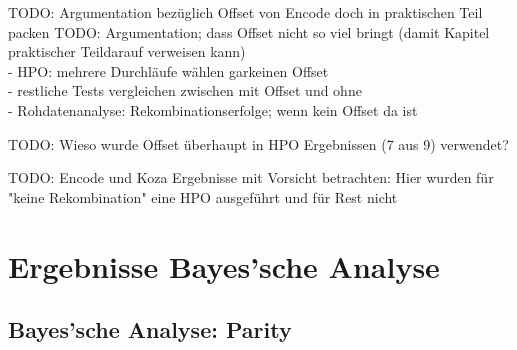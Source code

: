 TODO: Argumentation bezüglich Offset von Encode doch in praktischen Teil packen
TODO: Argumentation; dass Offset nicht so viel bringt (damit Kapitel \glqq praktischer Teil\grqq\space darauf verweisen kann)\\
- HPO: mehrere Durchläufe wählen garkeinen Offset\\
- restliche Tests vergleichen zwischen mit Offset und ohne\\
- Rohdatenanalyse: Rekombinationserfolge; wenn kein Offset da ist


TODO: Wieso wurde Offset überhaupt in HPO Ergebnissen (7 aus 9) verwendet?

TODO: Encode und Koza Ergebnisse mit Vorsicht betrachten: Hier wurden für "keine Rekombination" eine HPO ausgeführt und für Rest nicht





\section{Ergebnisse Bayes'sche Analyse}
\label{sec:ergebnisseBayes}

\subsection{Bayes'sche Analyse: Parity}
\label{subsec:bayesParity}

